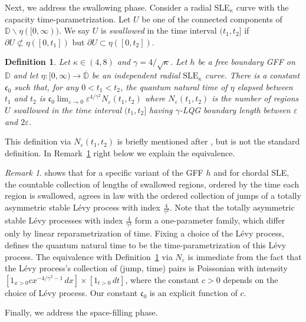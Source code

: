 \documentclass[a4paper]{article}
\numberwithin{equation}{section}
\def\eps{\varepsilon}
\newcommand{\D}{\mathbb{D}}
\newcommand{\clD}{\overline{\mathbb{D}}}
\newcommand{\SLE}{\mathrm{SLE}}
\newtheorem{definition}[theorem]{Definition}
\theoremstyle{remark}
\newtheorem{remark}[theorem]{Remark}
\numberwithin{equation}{section}
\begin{document}
Next, we address the swallowing phase. Consider a radial SLE$_\kappa$ curve with the capacity time-parametrization. Let $U$ be one of the connected components of $\D \backslash \eta([0,\infty))$. We say $U$ is \emph{swallowed} in the time interval $(t_1, t_2]$ if $\partial U \not \subset \eta([0,t_1])$ but $\partial U \subset \eta([0,t_2])$. 
\begin{definition}\label{def-quantum-time-swallowing}
    Let $\kappa \in (4,8)$ and $\gamma = 4/\sqrt \kappa$. Let $h$ be a free boundary GFF on $\D$ and let $\eta: [0,\infty) \to \clD$ be an independent radial $\SLE_\kappa$ curve. There is a constant $\mathfrak c_0$ such that, for any $0 < t_1 < t_2$,
     the \emph{quantum natural time} of $\eta$ elapsed between $t_1$ and $t_2$ is $\mathfrak c_0 \lim_{\eps \to 0}  \eps^{4/\gamma^2} N_\eps(t_1, t_2)$ where $N_\eps(t_1, t_2)$ is the number of regions $U$ swallowed in the time interval $(t_1, t_2]$ having $\gamma$-LQG boundary length between $\eps$ and $2\eps$. 
\end{definition}
This definition via $N_\eps(t_1, t_2)$ is briefly mentioned after \cite[Proposition 1.4.5]{DMS14}, but is not the standard definition. In Remark~\ref{remark-quantum-time-swallowing} right below we explain the equivalence.
\begin{remark}\label{remark-quantum-time-swallowing}
    \cite[Theorem 6.5.7]{DMS14} shows that for a specific variant of the GFF $h$ and for chordal SLE, the countable collection of lengths of swallowed regions, ordered by the time each region is swallowed, agrees in law with the ordered collection of jumps of a totally asymmetric stable L\'evy process with index $\frac4{\gamma^2}$. Note that the totally asymmetric stable L\'evy processes with index $\frac4{\gamma^2}$ form a one-parameter family, which differ only by linear reparametrization of time. Fixing a choice of the L\'evy process,
    \cite[Definition 6.5.8]{DMS14} defines the quantum natural time to be the time-parametrization of this L\'evy process. The equivalence with Definition~\ref{def-quantum-time-swallowing} via $N_\eps$ is immediate from the fact that the L\'evy process's  collection of (jump, time) pairs is Poissonian with intensity $[1_{x > 0} c x^{-4/\gamma^2-1} \, dx] \times [1_{t > 0} \, dt]$, where the constant $c>0$ depends on the choice of L\'evy process. Our constant $\mathfrak c_0$ is an explicit function of $c$. 
\end{remark}

Finally, we address the space-filling phase. 
\end{document}
